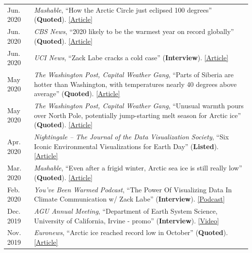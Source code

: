 \documentclass[margin,line,palatino,courier,10pt]{res}
\begin{document}
\begin{resume}
\begin{tabular}{@{}p{0.9in}p{4in}}
Jun. 2020 & \textit{Mashable}, ``How the Arctic Circle just eclipsed 100 degrees'' (\textbf{Quoted}). \href{https://mashable.com/article/arctic-heat-100-degrees/}{[Article]}\\
Jun. 2020 & \textit{CBS News}, ``2020 likely to be the warmest year on record globally'' (\textbf{Quoted}). \href{https://www.cbsnews.com/news/warmest-year-on-record-2020-likely/}{[Article]}\\
Jun. 2020 & \textit{UCI News}, ``Zack Labe cracks a cold case'' (\textbf{Interview}). \href{https://medium.com/@UCISoPS/zack-labe-cracks-a-cold-case-6e8793248e9d}{[Article]}\\
May 2020 & \textit{The Washington Post, Capital Weather Gang}, ``Parts of Siberia are hotter than Washington, with temperatures nearly 40 degrees above average'' (\textbf{Quoted}). \href{https://www.washingtonpost.com/weather/2020/05/22/siberia-heat-wave/}{[Article]}\\
May 2020 & \textit{The Washington Post, Capital Weather Gang}, ``Unusual warmth pours over North Pole, potentially jump-starting melt season for Arctic ice'' (\textbf{Quoted}). \href{https://www.washingtonpost.com/weather/2020/05/14/arctic-temperature-spike-sea-ice/}{[Article]}\\
Apr. 2020 & \textit{Nightingale – The Journal of the Data Visualization Society}, ``Six Iconic Environmental Visualizations for Earth Day'' (\textbf{Listed}). \href{https://medium.com/nightingale/six-iconic-environmental-visualizations-for-earth-day-d7a5bdaf177b}{[Article]}\\
Mar. 2020 & \textit{Mashable}, ``Even after a frigid winter, Arctic sea ice is still really low'' (\textbf{Quoted}). \href{https://mashable.com/article/arctic-sea-ice-low-2020/}{[Article]}\\
Feb. 2020 & \textit{You’ve Been Warmed Podcast}, ``The Power Of Visualizing Data In Climate Communication w/ Zack Labe'' (\textbf{Interview}). \href{https://www.youvebeenwarmed.com/episodes/the-power-of-visualizing-data-in-climate-communication-w-zack-labe}{[Podcast]}\\
Dec. 2019 & \textit{AGU Annual Meeting}, ``Department of Earth System Science, University of California, Irvine - promo'' (\textbf{Interview}). \href{https://www.youtube.com/watch?v=QSDRbSkJeqg&feature=youtu.be}{[Video]}\\
Nov. 2019 & \textit{Euronews}, ``Arctic ice reached record low in October'' (\textbf{Quoted}). \href{https://www.euronews.com/2019/11/04/arctic-ice-reached-record-low-in-october}{[Article]}\\

\end{tabular}
\end{resume}
\end{document}
